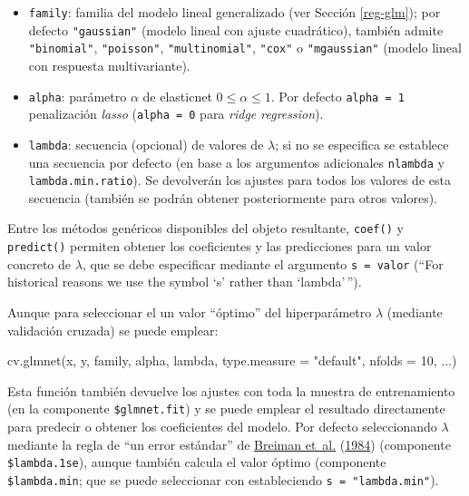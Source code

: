 \documentclass[
  spanish,
]{book}
\newenvironment{Shaded}{\begin{snugshade}}{\end{snugshade}}
\newcommand{\AttributeTok}[1]{\textcolor[rgb]{0.77,0.63,0.00}{#1}}
\newcommand{\DecValTok}[1]{\textcolor[rgb]{0.00,0.00,0.81}{#1}}
\newcommand{\FunctionTok}[1]{\textcolor[rgb]{0.00,0.00,0.00}{#1}}
\newcommand{\NormalTok}[1]{#1}
\newcommand{\StringTok}[1]{\textcolor[rgb]{0.31,0.60,0.02}{#1}}
\theoremstyle{break}
\theoremstyle{definition}
\theoremstyle{definition}
\theoremstyle{definition}
\theoremstyle{definition}
\theoremstyle{remark}
\begin{document}
\begin{itemize}
\item
  \texttt{family}: familia del modelo lineal generalizado (ver Sección \ref{reg-glm}); por defecto \texttt{"gaussian"} (modelo lineal con ajuste cuadrático), también admite \texttt{"binomial"}, \texttt{"poisson"}, \texttt{"multinomial"}, \texttt{"cox"} o \texttt{"mgaussian"} (modelo lineal con respuesta multivariante).
\item
  \texttt{alpha}: parámetro \(\alpha\) de elasticnet \(0 \leq \alpha \leq 1\). Por defecto \texttt{alpha\ =\ 1} penalización \emph{lasso} (\texttt{alpha\ =\ 0} para \emph{ridge regression}).
\item
  \texttt{lambda}: secuencia (opcional) de valores de \(\lambda\); si no se especifica se establece una secuencia por defecto (en base a los argumentos adicionales \texttt{nlambda} y \texttt{lambda.min.ratio}). Se devolverán los ajustes para todos los valores de esta secuencia (también se podrán obtener posteriormente para otros valores).
\end{itemize}

Entre los métodos genéricos disponibles del objeto resultante, \texttt{coef()} y \texttt{predict()} permiten obtener los coeficientes y las predicciones para un valor concreto de \(\lambda\), que se debe especificar mediante el argumento \texttt{s\ =\ valor} (``For historical reasons we use the symbol `s' rather than `lambda'\,'').

Aunque para seleccionar el un valor ``óptimo'' del hiperparámetro \(\lambda\) (mediante validación cruzada) se puede emplear:

\begin{Shaded}
\begin{Highlighting}[]
\FunctionTok{cv.glmnet}\NormalTok{(x, y, family, alpha, lambda, }\AttributeTok{type.measure =} \StringTok{"default"}\NormalTok{, }\AttributeTok{nfolds =} \DecValTok{10}\NormalTok{, ...)}
\end{Highlighting}
\end{Shaded}

Esta función también devuelve los ajustes con toda la muestra de entrenamiento (en la componente \texttt{\$glmnet.fit}) y se puede emplear el resultado directamente para predecir o obtener los coeficientes del modelo.
Por defecto seleccionando \(\lambda\) mediante la regla de ``un error estándar'' de \protect\hyperlink{ref-breiman1984classification}{Breiman et~al.} (\protect\hyperlink{ref-breiman1984classification}{1984}) (componente \texttt{\$lambda.1se}), aunque también calcula el valor óptimo (componente \texttt{\$lambda.min}; que se puede seleccionar con estableciendo \texttt{s\ =\ "lambda.min"}).
\end{document}
